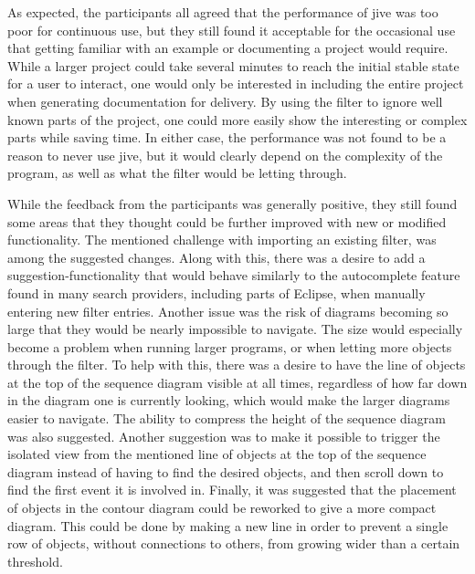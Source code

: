As expected, the participants all agreed that the performance of \gls{jive} was too poor for continuous use, but they still found it acceptable for the occasional use that getting familiar with an example or documenting a project would require.
While a larger project could take several minutes to reach the initial stable state for a user to interact, one would only be interested in including the entire project when generating documentation for delivery.
By using the filter to ignore well known parts of the project, one could more easily show the interesting or complex parts while saving time.
In either case, the performance was not found to be a reason to never use \gls{jive}, but it would clearly depend on the complexity of the program, as well as what the filter would be letting through.

While the feedback from the participants was generally positive, they still found some areas that they thought could be further improved with new or modified functionality.
The mentioned challenge with importing an existing filter, was among the suggested changes.
Along with this, there was a desire to add a suggestion-functionality that would behave similarly to the autocomplete feature found in many search providers, including parts of Eclipse, when manually entering new filter entries.
Another issue was the risk of diagrams becoming so large that they would be nearly impossible to navigate.
The size would especially become a problem when running larger programs, or when letting more objects through the filter.
To help with this, there was a desire to have the line of objects at the top of the sequence diagram visible at all times, regardless of how far down in the diagram one is currently looking, which would make the larger diagrams easier to navigate.
The ability to compress the height of the sequence diagram was also suggested.
Another suggestion was to make it possible to trigger the isolated view from the mentioned line of objects at the top of the sequence diagram instead of having to find the desired objects, and then scroll down to find the first event it is involved in.
Finally, it was suggested that the placement of objects in the contour diagram could be reworked to give a more compact diagram.
This could be done by making a new line in order to prevent a single row of objects, without connections to others, from growing wider than a certain threshold.
